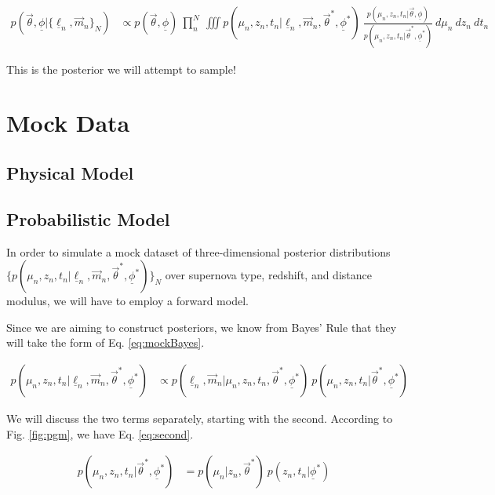 \documentclass[12pt, onecolumn]{emulateapj}
\newcommand{\textul}{\underline}
\begin{document}
\begin{align}
p(\vec{\theta}, \textul{\phi} | \{\textul{\ell}_{n}, \vec{m}_{n}\}_{N}) &\propto p(\vec{\theta}, \textul{\phi})\ \prod_{n}^{N}\ \iiint p(\mu_{n}, z_{n}, t_{n} | \textul{\ell}_{n}, \vec{m}_{n}, \vec{\theta}^{*}, \textul{\phi}^{*})\ \frac{p(\mu_{n}, z_{n}, t_{n} | \vec{\theta}, \textul{\phi})}{p(\mu_{n}, z_{n}, t_{n} | \vec{\theta}^{*}, \textul{\phi}^{*})}\ d\mu_{n}\ dz_{n}\ dt_{n}
\end{align}

This is the posterior we will attempt to sample!

\section{Mock Data}
\label{sec:data}

\subsection{Physical Model}
\label{sec:physics}

\subsection{Probabilistic Model}
\label{sec:probabilities}

In order to simulate a mock dataset of three-dimensional posterior distributions $\{p(\mu_{n}, z_{n}, t_{n} | \textul{\ell}_{n}, \vec{m}_{n}, \vec{\theta}^{*}, \textul{\phi}^{*})\}_{N}$ over supernova type, redshift, and distance modulus, we will have to employ a forward model.

Since we are aiming to construct posteriors, we know from Bayes' Rule that they will take the form of Eq. \ref{eq:mockBayes}.

\begin{align}
\label{eq:mockBayes}
p(\mu_{n}, z_{n}, t_{n} | \textul{\ell}_{n}, \vec{m}_{n}, \vec{\theta}^{*}, \textul{\phi}^{*}) &\propto p(\textul{\ell}_{n}, \vec{m}_{n} | \mu_{n}, z_{n}, t_{n}, \vec{\theta}^{*}, \textul{\phi}^{*})\ p(\mu_{n}, z_{n}, t_{n} | \vec{\theta}^{*}, \textul{\phi}^{*})
\end{align}

We will discuss the two terms separately, starting with the second.  According to Fig. \ref{fig:pgm}, we have Eq. \ref{eq:second}.

\begin{align}
\label{eq:second}
p(\mu_{n}, z_{n}, t_{n} | \vec{\theta}^{*}, \textul{\phi}^{*}) &= p(\mu_{n} | z_{n}, \vec{\theta}^{*})\ p(z_{n}, t_{n} | \textul{\phi}^{*})
\end{align}
\end{document}
